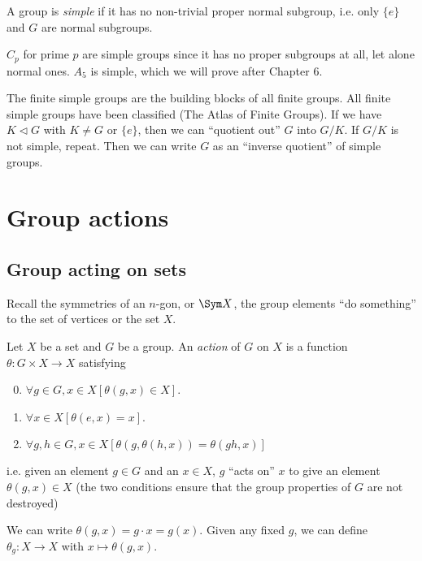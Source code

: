 \documentclass[a4pape]{article}
\begin{document}
\begin{defi}
  A group is \emph{simple} if it has no non-trivial proper normal subgroup, i.e. only $\{e\}$ and $G$ are normal subgroups.
\end{defi}

\begin{eg}
  $C_p$ for prime $p$ are simple groups since it has no proper subgroups at all, let alone normal ones.
  $A_5$ is simple, which we will prove after Chapter 6.
\end{eg}

The finite simple groups are the building blocks of all finite groups. All finite simple groups have been classified (The Atlas of Finite Groups). If we have $K\lhd G$ with $K\not= G$ or $\{e\}$, then we can ``quotient out'' $G$ into $G/K$. If $G/K$ is not simple, repeat. Then we can write $G$ as an ``inverse quotient'' of simple groups.

\section{Group actions}
\subsection{Group acting on sets}
Recall the symmetries of an $n$-gon, or $\Sym X$, the group elements ``do something'' to the set of vertices or the set $X$.

\begin{defi}
  Let $X$ be a set and $G$ be a group. An \emph{action} of $G$ on $X$ is a function $\theta: G\times X\to X$ satisfying
  \begin{enumerate}[label=\arabic{*}.]
    \setcounter{enumi}{-1}
  \item $\forall g\in G, x\in X[\theta(g, x)\in X]$.
  \item $\forall x\in X[\theta(e, x) = x]$.
  \item $\forall g, h\in G, x\in X[\theta(g, \theta (h, x)) = \theta(gh, x)]$
  \end{enumerate}
  i.e. given an element $g\in G$ and an $x\in X$, $g$ ``acts on'' $x$ to give an element $\theta(g, x)\in X$ (the two conditions ensure that the group properties of $G$ are not destroyed)
\end{defi}

\begin{notation}
  We can write $\theta(g, x) = g\cdot x = g(x)$. Given any fixed $g$, we can define $\theta_g: X\to X$ with $x\mapsto \theta(g, x)$.
\end{notation}
\end{document}
